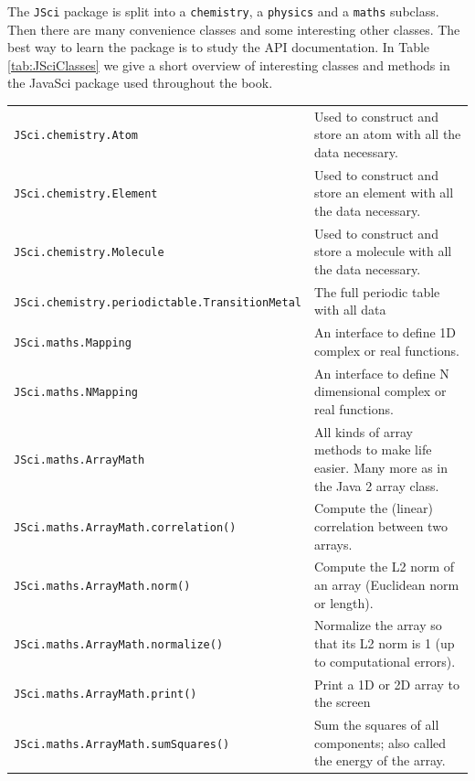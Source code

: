 The \verb|JSci| package is split into a 
\verb|chemistry|, a \verb|physics| and a \verb|maths| subclass.
Then there are many convenience classes and some interesting other classes.
The best way to learn the package is to study the API documentation. 
In Table \ref{tab:JSciClasses} we give a short overview of interesting 
classes and methods in the JavaSci package used throughout the book.
\begin{landscape}
\begin{table}[htbp]
  \begin{center} \small
    \begin{tabular}{ll}
      \verb|JSci.chemistry.Atom| & Used to construct and store an atom 
                                   with all the data necessary.\\
      \verb|JSci.chemistry.Element| & Used to construct and store an element 
                                   with all the data necessary.\\
      \verb|JSci.chemistry.Molecule| & Used to construct and store a molecule 
                                   with all the data necessary.\\
      \verb|JSci.chemistry.periodictable.TransitionMetal| & The full periodic
         table with all data\\\hline
      \verb|JSci.maths.Mapping| & An interface to define 1D complex or real
                functions.\\
      \verb|JSci.maths.NMapping| & An interface to define N dimensional 
                complex or real functions.\\\hline
      \verb|JSci.maths.ArrayMath| & All kinds of array methods to make
                  life easier. Many more as in the Java 2 array class. \\
\verb|JSci.maths.ArrayMath.correlation()| & 
              Compute the (linear) correlation between two arrays. \\
\verb|JSci.maths.ArrayMath.norm()| & 
       Compute the L2 norm of an array (Euclidean norm or length). \\
\verb|JSci.maths.ArrayMath.normalize()| & 
   Normalize the array so that its L2 norm is 1 (up to computational errors).\\
\verb|JSci.maths.ArrayMath.print()| & Print a 1D or 2D array to the screen\\
 \verb|JSci.maths.ArrayMath.sumSquares()| & 
   Sum the squares of all components; also called the energy of the array. \\

\end{tabular}
\end{center}
\end{table}
\end{landscape}
